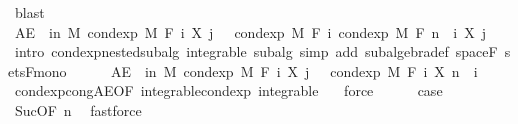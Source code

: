 \begin{isabellebody}
\ blast\isanewline
\ \ \ \ \isamarkupfalse%
\ {\isachardoublequoteopen}AE\ {\isasymxi}\ in\ M{\isachardot}{\kern0pt}\ cond{\isacharunderscore}{\kern0pt}exp\ M\ {\isacharparenleft}{\kern0pt}F\ i{\isacharparenright}{\kern0pt}\ {\isacharparenleft}{\kern0pt}X\ j{\isacharparenright}{\kern0pt}\ {\isasymxi}\ {\isacharequal}{\kern0pt}\ cond{\isacharunderscore}{\kern0pt}exp\ M\ {\isacharparenleft}{\kern0pt}F\ i{\isacharparenright}{\kern0pt}\ {\isacharparenleft}{\kern0pt}cond{\isacharunderscore}{\kern0pt}exp\ M\ {\isacharparenleft}{\kern0pt}F\ {\isacharparenleft}{\kern0pt}n\ {\isacharplus}{\kern0pt}\ i{\isacharparenright}{\kern0pt}{\isacharparenright}{\kern0pt}\ {\isacharparenleft}{\kern0pt}X\ j{\isacharparenright}{\kern0pt}{\isacharparenright}{\kern0pt}\ {\isasymxi}{\isachardoublequoteclose}\ \isamarkupfalse%
\ {\isacharparenleft}{\kern0pt}intro\ cond{\isacharunderscore}{\kern0pt}exp{\isacharunderscore}{\kern0pt}nested{\isacharunderscore}{\kern0pt}subalg\ integrable\ subalg{\isacharcomma}{\kern0pt}\ simp\ add{\isacharcolon}{\kern0pt}\ subalgebra{\isacharunderscore}{\kern0pt}def\ space{\isacharunderscore}{\kern0pt}F\ sets{\isacharunderscore}{\kern0pt}F{\isacharunderscore}{\kern0pt}mono{\isacharparenright}{\kern0pt}\isanewline
\ \ \ \ \isamarkupfalse%
\ {\isachardoublequoteopen}AE\ {\isasymxi}\ in\ M{\isachardot}{\kern0pt}\ cond{\isacharunderscore}{\kern0pt}exp\ M\ {\isacharparenleft}{\kern0pt}F\ i{\isacharparenright}{\kern0pt}\ {\isacharparenleft}{\kern0pt}X\ j{\isacharparenright}{\kern0pt}\ {\isasymxi}\ {\isacharequal}{\kern0pt}\ cond{\isacharunderscore}{\kern0pt}exp\ M\ {\isacharparenleft}{\kern0pt}F\ i{\isacharparenright}{\kern0pt}\ {\isacharparenleft}{\kern0pt}X\ {\isacharparenleft}{\kern0pt}n\ {\isacharplus}{\kern0pt}\ i{\isacharparenright}{\kern0pt}{\isacharparenright}{\kern0pt}\ {\isasymxi}{\isachardoublequoteclose}\ \isamarkupfalse%
\ cond{\isacharunderscore}{\kern0pt}exp{\isacharunderscore}{\kern0pt}cong{\isacharunderscore}{\kern0pt}AE{\isacharbrackleft}{\kern0pt}OF\ integrable{\isacharunderscore}{\kern0pt}cond{\isacharunderscore}{\kern0pt}exp\ integrable\ {\isacharasterisk}{\kern0pt}{\isacharbrackright}{\kern0pt}\ \isamarkupfalse%
\ force\isanewline
\ \ \ \ \isamarkupfalse%
\ {\isacharquery}{\kern0pt}case\ \isamarkupfalse%
\ Suc{\isacharparenleft}{\kern0pt}{}{\isacharparenright}{\kern0pt}{\isacharbrackleft}{\kern0pt}OF\ n{\isacharbrackright}{\kern0pt}\ \isamarkupfalse%
\ fastforce\isanewline
\ \ \isamarkupfalse%

\end{isabellebody}
